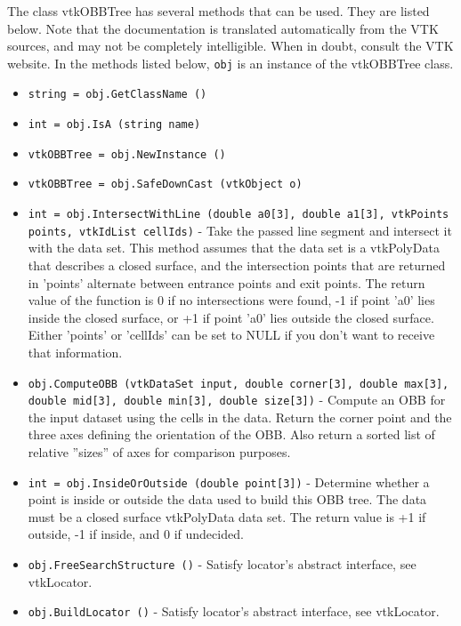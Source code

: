 The class vtkOBBTree has several methods that can be used.
  They are listed below.
Note that the documentation is translated automatically from the VTK sources,
and may not be completely intelligible.  When in doubt, consult the VTK website.
In the methods listed below, \verb|obj| is an instance of the vtkOBBTree class.
\begin{itemize}
\item  \verb|string = obj.GetClassName ()|

\item  \verb|int = obj.IsA (string name)|

\item  \verb|vtkOBBTree = obj.NewInstance ()|

\item  \verb|vtkOBBTree = obj.SafeDownCast (vtkObject o)|

\item  \verb|int = obj.IntersectWithLine (double a0[3], double a1[3], vtkPoints points, vtkIdList cellIds)| -  Take the passed line segment and intersect it with the data set.
 This method assumes that the data set is a vtkPolyData that describes
 a closed surface, and the intersection points that are returned in
 'points' alternate between entrance points and exit points.
 The return value of the function is 0 if no intersections were found,
 -1 if point 'a0' lies inside the closed surface, or +1 if point 'a0'
 lies outside the closed surface.
 Either 'points' or 'cellIds' can be set to NULL if you don't want
 to receive that information.

\item  \verb|obj.ComputeOBB (vtkDataSet input, double corner[3], double max[3], double mid[3], double min[3], double size[3])| -  Compute an OBB for the input dataset using the cells in the data.
 Return the corner point and the three axes defining the orientation
 of the OBB. Also return a sorted list of relative ''sizes'' of axes for
 comparison purposes.

\item  \verb|int = obj.InsideOrOutside (double point[3])| -  Determine whether a point is inside or outside the data used to build
 this OBB tree.  The data must be a closed surface vtkPolyData data set.
 The return value is +1 if outside, -1 if inside, and 0 if undecided.

\item  \verb|obj.FreeSearchStructure ()| -  Satisfy locator's abstract interface, see vtkLocator.

\item  \verb|obj.BuildLocator ()| -  Satisfy locator's abstract interface, see vtkLocator.


\end{itemize}
